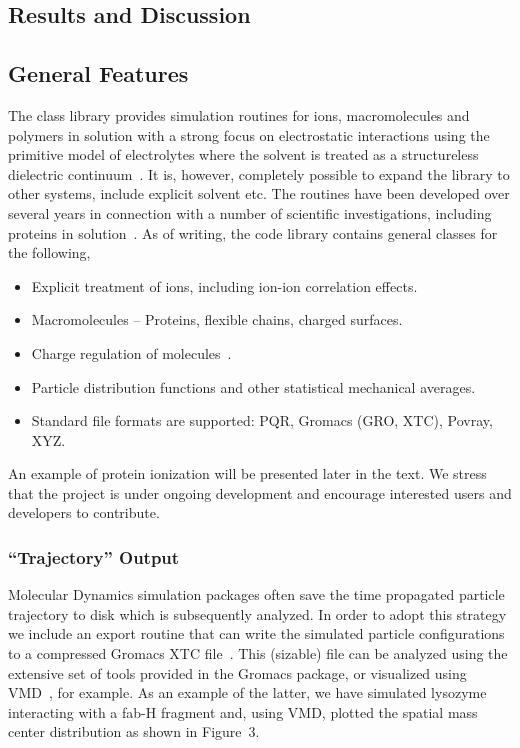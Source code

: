 \documentclass[10pt]{bmc_article}
\newenvironment{bmcformat}{\begin{raggedright}\baselineskip20pt\sloppy\setboolean{publ}{false}}{\end{raggedright}\baselineskip20pt\sloppy}
\begin{document}
\begin{bmcformat}
 
\section*{Results and Discussion}
\subsection*{General Features}
The class library provides simulation routines for ions, macromolecules and polymers in solution with a strong focus on electrostatic interactions using the primitive model of electrolytes where the solvent is treated as a structureless dielectric continuum~\cite{hill:86}.
It is, however, completely possible to expand the library to other systems, include explicit solvent etc. The routines have been developed over several years in connection with a number of scientific investigations, including proteins in solution~\cite{lund-thesis}.
As of writing, the code library contains general classes for the following,
\begin{itemize}
\item Explicit treatment of ions, including ion-ion correlation effects.
\item Macromolecules -- Proteins, flexible chains, charged surfaces.
\item Charge regulation of molecules~\cite{lund:05}.
\item Particle distribution functions and other statistical mechanical averages.
\item Standard file formats are supported: PQR, Gromacs (GRO, XTC), Povray, XYZ.
\end{itemize}
An example of protein ionization will be presented later in the text.
We stress that the project is under ongoing development and encourage interested users and developers to contribute.

\subsubsection*{``Trajectory'' Output}
Molecular Dynamics simulation packages often save the time propagated particle trajectory to disk which is subsequently analyzed.
In order to adopt this strategy we include an export routine that can write the simulated particle configurations to a compressed Gromacs XTC file~\cite{gromacs}.
This (sizable) file can be analyzed using the extensive set of tools provided in the Gromacs package, or visualized using VMD~\cite{vmd}, for example.
As an example of the latter, we have simulated lysozyme interacting with a fab-H fragment and, using VMD, plotted the spatial mass center distribution as shown in Figure~3.


\end{bmcformat}
\end{document}

